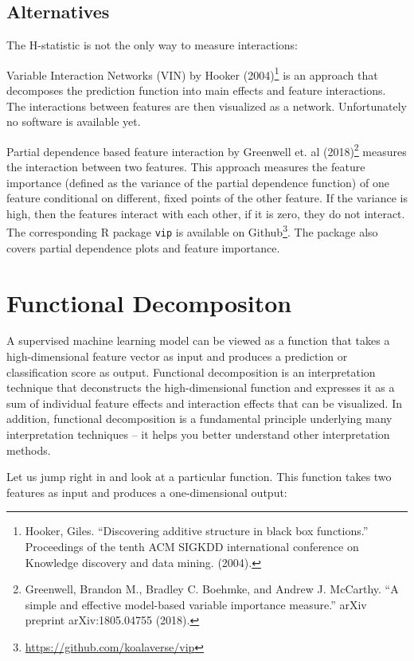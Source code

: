 \documentclass[12pt,]{krantz}
\renewcommand{\href}[2]{#2\footnote{\url{#1}}}
\begin{document}
\subsection{Alternatives}\label{alternatives}

The H-statistic is not the only way to measure interactions:

Variable Interaction Networks (VIN) by Hooker (2004)\footnote{Hooker,
  Giles. ``Discovering additive structure in black box functions.''
  Proceedings of the tenth ACM SIGKDD international conference on
  Knowledge discovery and data mining. (2004).} is an approach that
decomposes the prediction function into main effects and feature
interactions. The interactions between features are then visualized as a
network. Unfortunately no software is available yet.

Partial dependence based feature interaction by Greenwell et. al
(2018)\footnote{Greenwell, Brandon M., Bradley C. Boehmke, and Andrew J.
  McCarthy. ``A simple and effective model-based variable importance
  measure.'' arXiv preprint arXiv:1805.04755 (2018).} measures the
interaction between two features. This approach measures the feature
importance (defined as the variance of the partial dependence function)
of one feature conditional on different, fixed points of the other
feature. If the variance is high, then the features interact with each
other, if it is zero, they do not interact. The corresponding R package
\texttt{vip} is available on
\href{https://github.com/koalaverse/vip}{Github}. The package also
covers partial dependence plots and feature importance.

\hypertarget{decomposition}{\section{Functional
Decompositon}\label{decomposition}}

A supervised machine learning model can be viewed as a function that
takes a high-dimensional feature vector as input and produces a
prediction or classification score as output. Functional decomposition
is an interpretation technique that deconstructs the high-dimensional
function and expresses it as a sum of individual feature effects and
interaction effects that can be visualized. In addition, functional
decomposition is a fundamental principle underlying many interpretation
techniques -- it helps you better understand other interpretation
methods.

Let us jump right in and look at a particular function. This function
takes two features as input and produces a one-dimensional output:
\end{document}
